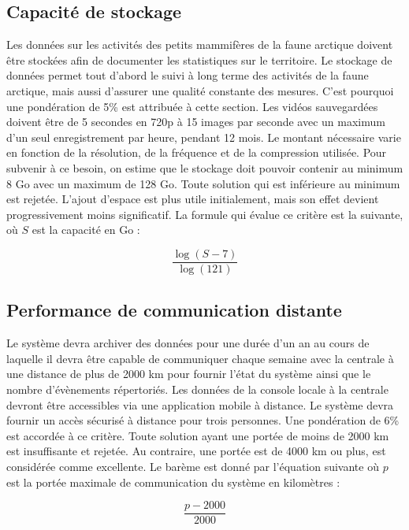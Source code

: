 \subsection{Capacité de stockage}
\label{conservation_donnees}
Les données sur les activités des petits mammifères de la faune arctique doivent être stockées afin de documenter les statistiques sur le territoire.
Le stockage de données permet tout d’abord le suivi à long terme des activités de la faune arctique, mais aussi d’assurer une qualité constante des mesures.
C’est pourquoi une pondération de 5\% est attribuée à cette section.
Les vidéos sauvegardées doivent être de 5 secondes en 720p à 15 images par seconde avec un maximum d’un seul enregistrement par heure, pendant 12 mois.
Le montant nécessaire varie en fonction de la résolution, de la fréquence et de la compression utilisée.
Pour subvenir à ce besoin, on estime que le stockage doit pouvoir contenir au minimum 8 Go avec un maximum de 128 Go.
Toute solution qui est inférieure au minimum est rejetée.
L’ajout d'espace est plus utile initialement, mais son effet devient progressivement moins significatif.
La formule qui évalue ce critère est la suivante, où $S$ est la capacité en Go :

\begin{equation}
    \frac{\log(S-7)}{\log(121)}
\end{equation}

\subsection{Performance de communication distante}
\label{performance_communication}
Le système devra archiver des données pour une durée d’un an au cours de laquelle il devra être capable de communiquer chaque semaine avec la centrale à une distance de plus de 2000 km pour fournir l’état du système ainsi que le nombre d’évènements répertoriés.
Les données de la console locale à la centrale devront être accessibles via une application mobile à distance.
Le système devra fournir un accès sécurisé à distance pour trois personnes. Une pondération de 6\% est accordée à ce critère.
Toute solution ayant une portée de moins de 2000 km est insuffisante et rejetée. Au contraire, une portée est de 4000 km ou plus, est considérée comme excellente. 
Le barème est donné par l’équation suivante où $p$ est la portée maximale de communication du système en kilomètres :

\begin{equation}
    \frac{p-2000}{2000}
\end{equation}

